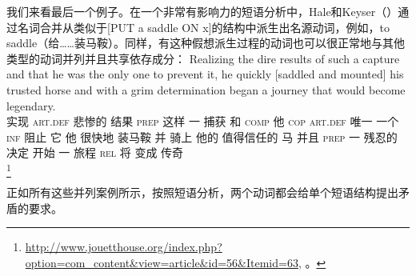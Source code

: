     我们来看最后一个例子。在一个非常有影响力的短语分析中，Hale和Keyser（\citeyear{HK93a-u}）通过名词合并从类似于[PUT a saddle ON x]的结构中派生出名源动词，例如，to saddle（给……装马鞍）。同样，有这种假想派生过程的动词也可以很正常地与其他类型的动词并列并且共享依存成分：
\ea
\gll Realizing the dire results of such a capture and that he was the only one to prevent it, he quickly [saddled and mounted] his trusted horse and with a grim determination began a journey that would become legendary.\\
    实现 \textsc{art}.\textsc{def} 悲惨的 结果 \textsc{prep} 这样 一 捕获 和 \textsc{comp} 他 \textsc{cop} \textsc{art}.\textsc{def} 唯一 一个 \textsc{inf} 阻止 它 他 很快地 \spacebr{}装马鞍 并 骑上 他的 值得信任的 马 并且 \textsc{prep} 一 残忍的 决定 开始 一 旅程 \textsc{rel} 将 变成 传奇\\
\footnote{\url{http://www.jouetthouse.org/index.php?option=com_content&view=article&id=56&Itemid=63},
  。}  
\z

\noindent
正如所有这些\xnullc 并列案例所示，按照短语分析，两个动词都会给单个短语结构提出矛盾的要求。


